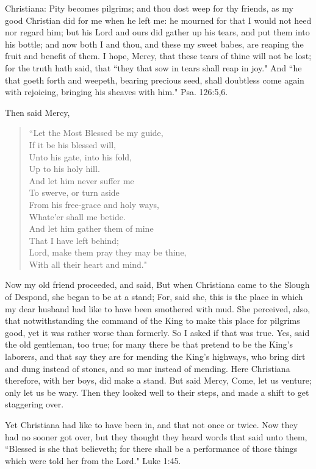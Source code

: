 Christiana: Pity becomes pilgrims; and thou dost weep for thy friends, as my good Christian did for me when he left me: he mourned for that I would not heed nor regard him; but his Lord and ours did gather up his tears, and put them into his bottle; and now both I and thou, and these my sweet babes, are reaping the fruit and benefit of them. I hope, Mercy, that these tears of thine will not be lost; for the truth hath said, that ``they that sow in tears shall reap in joy." And ``he that goeth forth and weepeth, bearing precious seed, shall doubtless come again with rejoicing, bringing his sheaves with him." Psa. 126:5,6.

Then said Mercy,
\begin{verse} 
``Let the Most Blessed be my guide,\\
If it be his blessed will,\\
Unto his gate, into his fold,\\
Up to his holy hill.\\ 
And let him never suffer me\\
To swerve, or turn aside\\
From his free-grace and holy ways,\\
Whate'er shall me betide.\\
And let him gather them of mine\\
That I have left behind;\\
Lord, make them pray they may be thine,\\
With all their heart and mind."\\
\end{verse}

Now my old friend proceeded, and said, But when Christiana came to the Slough of Despond, she began to be at a stand; For, said she, this is the place in which my dear husband had like to have been smothered with mud. She perceived, also, that notwithstanding the command of the King to make this place for pilgrims good, yet it was rather worse than formerly. So I asked if that was true. Yes, said the old gentleman, too true; for many there be that pretend to be the King's laborers, and that say they are for mending the King's highways, who bring dirt and dung instead of stones, and so mar instead of mending. Here Christiana therefore, with her boys, did make a stand. But said Mercy, Come, let us venture; only let us be wary. Then they looked well to their steps, and made a shift to get staggering over.

Yet Christiana had like to have been in, and that not once or twice. Now they had no sooner got over, but they thought they heard words that said unto them, ``Blessed is she that believeth; for there shall be a performance of those things which were told her from the Lord." Luke 1:45.

